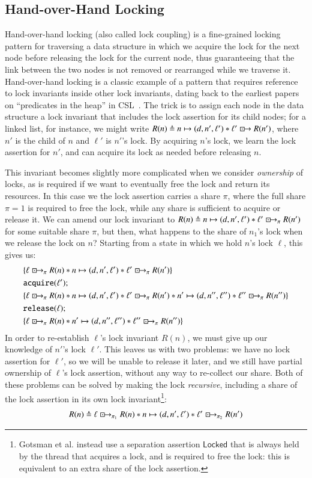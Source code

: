 \documentclass[a4paper,USenglish,cleveref, autoref, thm-restate]{lipics-v2021}
\newcommand{\islock}{\boxdotright}
\begin{document}
\subsection{Hand-over-Hand Locking}
\label{selflock}

Hand-over-hand locking (also called lock coupling) is a fine-grained locking pattern for traversing a data structure in which we acquire the lock for the next node before releasing the lock for the current node, thus guaranteeing that the link between the two nodes is not removed or rearranged while we traverse it. Hand-over-hand locking is a classic example of a pattern that requires reference to lock invariants inside other lock invariants, dating back to the earliest papers on ``predicates in the heap'' in CSL~\cite{gotsman}. The trick is to assign each node in the data structure a lock invariant that includes the lock assertion for its child nodes; for a linked list, for instance, we might write $R(n) \triangleq n \mapsto (d, n', \ell') * \ell' \islock R(n')$, where $n'$ is the child of $n$ and $\ell'$ is $n'$'s lock. By acquiring $n$'s lock, we learn the lock assertion for $n'$, and can acquire its lock as needed before releasing $n$.

This invariant becomes slightly more complicated when we consider \emph{ownership} of locks, as is required if we want to eventually free the lock and return its resources. In this case we the lock assertion carries a share $\pi$, where the full share $\pi = 1$ is required to free the lock, while any share is sufficient to acquire or release it. We can amend our lock invariant to $R(n) \triangleq n \mapsto (d, n', \ell') * \ell' \islock_\pi R(n')$ for some suitable share $\pi$, but then, what happens to the share of $n_1$'s lock when we release the lock on $n$? Starting from a state in which we hold $n$'s lock $\ell$, this gives us:
\begin{align*}
&\{ \ell \islock_\pi R(n) * n \mapsto (d, n', \ell') * \ell' \islock_\pi R(n') \}\\
&\texttt{acquire}(\ell');\\
&\{ \ell \islock_\pi R(n) * n \mapsto (d, n', \ell') * \ell' \islock_\pi R(n') * n' \mapsto (d, n'', \ell'') * \ell'' \islock_\pi R(n'') \}\\
&\texttt{release}(\ell);\\
&\{ \ell \islock_\pi R(n) * n' \mapsto (d, n'', \ell'') * \ell'' \islock_\pi R(n'') \}
\end{align*}
In order to re-establish $\ell$'s lock invariant $R(n)$, we must give up our knowledge of $n'$'s lock $\ell'$. This leaves us with two problems: we have no lock assertion for $\ell'$, so we will be unable to release it later, and we still have partial ownership of $\ell$'s lock assertion, without any way to re-collect our share. Both of these problems can be solved by making the lock \emph{recursive}, including a share of the lock assertion in its own lock invariant\footnote{Gotsman et al. instead use a separation assertion $\mathsf{Locked}$ that is always held by the thread that acquires a lock, and is required to free the lock: this is equivalent to an extra share of the lock assertion.}:
$$R(n) \triangleq \ell \islock_{\pi_1} R(n) * n \mapsto (d, n', \ell') * \ell' \islock_{\pi_2} R(n')$$
\end{document}
